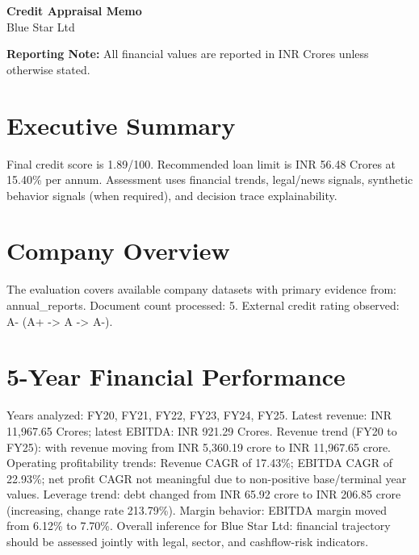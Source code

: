 \documentclass[11pt,a4paper]{article}
\begin{document}
\begin{center}
    {\LARGE \textbf{{Credit Appraisal Memo}}}\\[0.4em]
    {\large Blue Star Ltd}\\[0.2em]
\end{center}

\vspace{0.3em}
\colorbox{gray!12}{\parbox{\dimexpr\linewidth-2\fboxsep\relax}{\textbf{Reporting Note:} All financial values are reported in INR Crores unless otherwise stated.}}
\vspace{0.6em}

\section*{Executive Summary}
Final credit score is 1.89/100. Recommended loan limit is INR 56.48 Crores at 15.40\% per annum. Assessment uses financial trends, legal/news signals, synthetic behavior signals (when required), and decision trace explainability.

\section*{Company Overview}
The evaluation covers available company datasets with primary evidence from: annual\_reports. Document count processed: 5. External credit rating observed: A- (A+ -> A -> A-).

\section*{5-Year Financial Performance}
Years analyzed: FY20, FY21, FY22, FY23, FY24, FY25. Latest revenue: INR 11,967.65 Crores; latest EBITDA: INR 921.29 Crores. Revenue trend (FY20 to FY25): with revenue moving from INR 5,360.19 crore to INR 11,967.65 crore. Operating profitability trends: Revenue CAGR of 17.43\%; EBITDA CAGR of 22.93\%; net profit CAGR not meaningful due to non-positive base/terminal year values. Leverage trend: debt changed from INR 65.92 crore to INR 206.85 crore (increasing, change rate 213.79\%). Margin behavior: EBITDA margin moved from 6.12\% to 7.70\%. Overall inference for Blue Star Ltd: financial trajectory should be assessed jointly with legal, sector, and cashflow-risk indicators.
\end{document}
